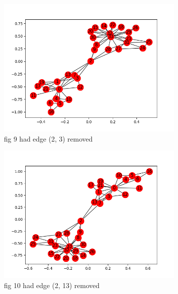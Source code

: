 \documentclass[10pt,letterpaper]{article}
\begin{document}
\begin{figure}[H]
\begin{subfigure}[b]{0.4\linewidth}
     \includegraphics[width=\linewidth]{karate09.png} 
     \caption{fig 9 had edge (2, 3) removed}
  \end{subfigure}
   \begin{subfigure}[b]{0.4\linewidth}
     \includegraphics[width=\linewidth]{karate10.png} 
     \caption{fig 10 had edge (2, 13) removed}
  \end{subfigure}
   \begin{subfigure}[b]{0.4\linewidth}

\end{subfigure}
\end{figure}
\end{document}
